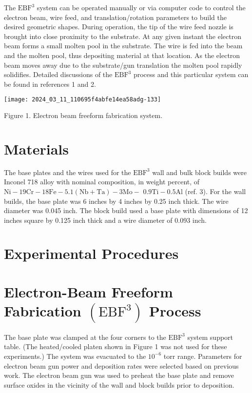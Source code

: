 \documentclass[10pt]{article}
\begin{document}
The $\mathrm{EBF}^{3}$ system can be operated manually or via computer code to control the electron beam, wire feed, and translation/rotation parameters to build the desired geometric shapes. During operation, the tip of the wire feed nozzle is brought into close proximity to the substrate. At any given instant the electron beam forms a small molten pool in the substrate. The wire is fed into the beam and the molten pool, thus depositing material at that location. As the electron beam moves away due to the substrate/gun translation the molten pool rapidly solidifies. Detailed discussions of the $\mathrm{EBF}^{3}$ process and this particular system can be found in references 1 and 2.

\begin{center}
\texttt{[image: 2024\_03\_11\_110695f4abfe14ea58adg-133]}
\end{center}

Figure 1. Electron beam freeform fabrication system.

\section*{Materials}
The base plates and the wires used for the $\mathrm{EBF}^{3}$ wall and bulk block builds were Inconel 718 alloy with nominal composition, in weight percent, of $\mathrm{Ni}-19 \mathrm{Cr}-18 \mathrm{Fe}-5.1(\mathrm{Nb}+\mathrm{Ta})-3 \mathrm{Mo}-$ $0.9 \mathrm{Ti}-0.5 \mathrm{Al}$ (ref. 3). For the wall builds, the base plate was 6 inches by 4 inches by 0.25 inch thick. The wire diameter was 0.045 inch. The block build used a base plate with dimensions of 12 inches square by 0.125 inch thick and a wire diameter of 0.093 inch.

\section*{Experimental Procedures}
\section*{Electron-Beam Freeform Fabrication $\left(\mathrm{EBF}^{3}\right)$ Process}
The base plate was clamped at the four corners to the $\mathrm{EBF}^{3}$ system support table. (The heated/cooled platen shown in Figure 1 was not used for these experiments.) The system was evacuated to the $10^{-6}$ torr range. Parameters for electron beam gun power and deposition rates were selected based on previous work. The electron beam gun was used to preheat the base plate and remove surface oxides in the vicinity of the wall and block builds prior to deposition.
\end{document}
